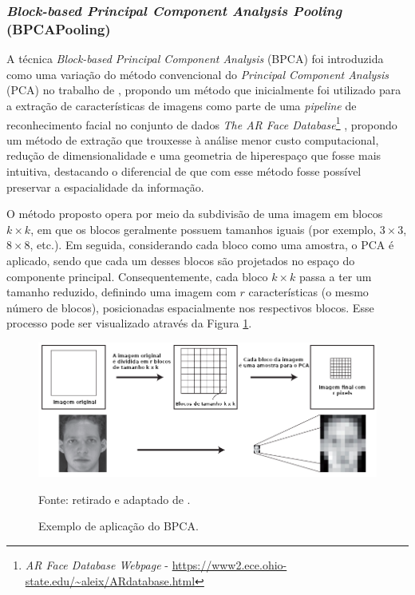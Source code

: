 \subsubsection{\textit{Block-based Principal Component Analysis Pooling} (BPCAPooling)}
\label{project:bpca}
A técnica \textit{Block-based Principal Component Analysis} (BPCA) foi introduzida como uma variação do método convencional do \textit{Principal Component Analysis} (PCA) no trabalho de \cite{Salvadeo2011}, propondo um método que inicialmente foi utilizado para a extração de características de imagens como parte de uma \textit{pipeline} de reconhecimento facial no conjunto de dados \textit{The AR Face Database}\footnote{\textit{AR Face Database Webpage} - \url{https://www2.ece.ohio-state.edu/~aleix/ARdatabase.html}} \citep{MartNez1998TheDatabase}, propondo um método de extração que trouxesse à análise menor custo computacional, redução de dimensionalidade e uma geometria de hiperespaço que fosse mais intuitiva, destacando o diferencial de que com esse método fosse possível preservar a espacialidade da informação.

O método proposto opera por meio da subdivisão de uma imagem em blocos $k \times k$, em que os blocos geralmente possuem tamanhos iguais (por exemplo, $3 \times 3$, $8 \times 8$, etc.). Em seguida, considerando cada bloco como uma amostra, o PCA é aplicado, sendo que cada um desses blocos são projetados no espaço do componente principal. Consequentemente, cada bloco $k \times k$ passa a ter um tamanho reduzido, definindo uma imagem com $r$ características (o mesmo número de blocos), posicionadas espacialmente nos respectivos blocos. Esse processo pode ser visualizado através da Figura \ref{project:fig:bpca_1}.

\begin{figure}[H]
    \centering
    \caption{Exemplo de aplicação do BPCA.}
    \label{project:fig:bpca_1}
    \includegraphics[width=1\textwidth]{recursos/imagens/project/BPCA.png}

    Fonte: retirado e adaptado de \cite{Salvadeo2011}.
\end{figure}


